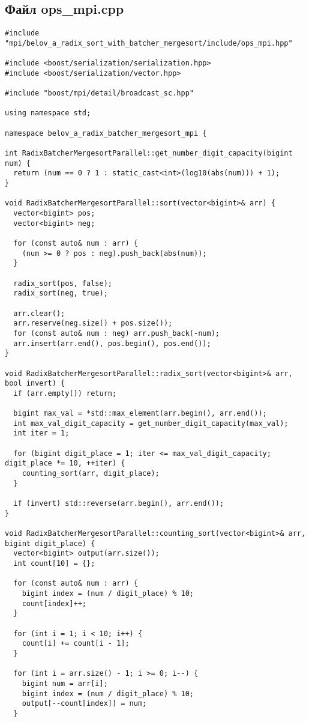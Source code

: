 ﻿\documentclass[a4paper,12pt]{article}
\begin{document}
\subsection*{Файл ops\_mpi.cpp}
\begin{lstlisting}
#include "mpi/belov_a_radix_sort_with_batcher_mergesort/include/ops_mpi.hpp"

#include <boost/serialization/serialization.hpp>
#include <boost/serialization/vector.hpp>

#include "boost/mpi/detail/broadcast_sc.hpp"

using namespace std;

namespace belov_a_radix_batcher_mergesort_mpi {

int RadixBatcherMergesortParallel::get_number_digit_capacity(bigint num) {
  return (num == 0 ? 1 : static_cast<int>(log10(abs(num))) + 1);
}

void RadixBatcherMergesortParallel::sort(vector<bigint>& arr) {
  vector<bigint> pos;
  vector<bigint> neg;

  for (const auto& num : arr) {
    (num >= 0 ? pos : neg).push_back(abs(num));
  }

  radix_sort(pos, false);
  radix_sort(neg, true);

  arr.clear();
  arr.reserve(neg.size() + pos.size());
  for (const auto& num : neg) arr.push_back(-num);
  arr.insert(arr.end(), pos.begin(), pos.end());
}

void RadixBatcherMergesortParallel::radix_sort(vector<bigint>& arr, bool invert) {
  if (arr.empty()) return;

  bigint max_val = *std::max_element(arr.begin(), arr.end());
  int max_val_digit_capacity = get_number_digit_capacity(max_val);
  int iter = 1;

  for (bigint digit_place = 1; iter <= max_val_digit_capacity; digit_place *= 10, ++iter) {
    counting_sort(arr, digit_place);
  }

  if (invert) std::reverse(arr.begin(), arr.end());
}

void RadixBatcherMergesortParallel::counting_sort(vector<bigint>& arr, bigint digit_place) {
  vector<bigint> output(arr.size());
  int count[10] = {};

  for (const auto& num : arr) {
    bigint index = (num / digit_place) % 10;
    count[index]++;
  }

  for (int i = 1; i < 10; i++) {
    count[i] += count[i - 1];
  }

  for (int i = arr.size() - 1; i >= 0; i--) {
    bigint num = arr[i];
    bigint index = (num / digit_place) % 10;
    output[--count[index]] = num;
  }


\end{lstlisting}
\end{document}
